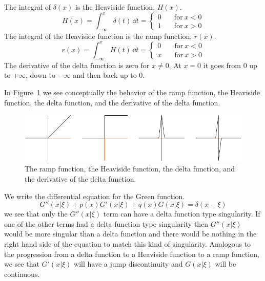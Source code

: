 The integral of $\delta(x)$ is the Heaviside function, $H(x)$.
\[
H(x) = \int_{-\infty}^x \delta(t)\,\dd t = 
\begin{cases}
  0 \quad &\mathrm{for}\ x < 0 \\
  1 \quad &\mathrm{for}\ x > 0
\end{cases}
\]
The integral of the Heaviside function is the ramp function, $r(x)$.
\[ 
r(x) = \int_{-\infty}^x H(t)\,\dd t = 
\begin{cases}
  0 \quad &\mathrm{for}\ x < 0 \\
  x \quad &\mathrm{for}\ x > 0
\end{cases}
\]
The derivative of the delta function is zero for $x \neq 0$.  At $x=0$
it goes from $0$ up to $+\infty$, down to $-\infty$ and then back
up to $0$.

In Figure~\ref{fig_delta} we see conceptually the behavior of the ramp 
function, the Heaviside function, the delta function, and the derivative of the
delta function.






\begin{figure}[tb!]
  \begin{center} 
    \includegraphics[width=\textwidth]{ode/inhomogeneous/delta}
  \end{center}
  \caption{The ramp function, the Heaviside function, the delta function, 
    and the derivative of the delta function.}
  \label{fig_delta}
\end{figure}



We write the differential equation for the Green function.
\[
G''(x|\xi) + p(x) G'(x|\xi) + q(x) G(x|\xi) = \delta(x-\xi)
\]
we see that only the $G''(x|\xi)$ term can have a delta function type 
singularity.  If one of the other terms had a delta function type singularity
then $G''(x|\xi)$ would be more singular than a delta function and there
would be nothing in the right hand side of the equation to match this 
kind of singularity.  
Analogous to the progression from a delta function to a Heaviside function
to a ramp function,
we see that $G'(x|\xi)$ will have a jump discontinuity and $G(x|\xi)$ will
be continuous.


